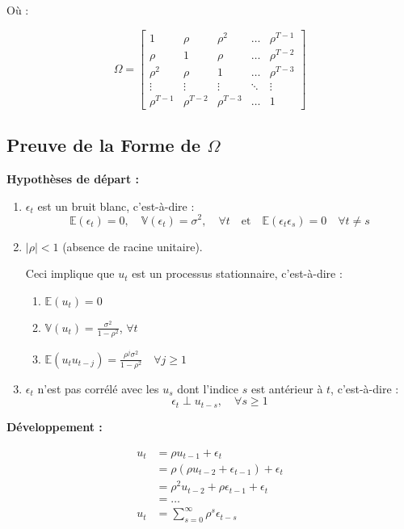 \documentclass[14pt]{extarticle} %
\theoremstyle{definition}
\theoremstyle{plain}
\begin{document}
Où :

\[
\Omega = \begin{bmatrix}
1 & \rho & \rho^2 & \dots & \rho^{T-1} \\
\rho & 1 & \rho & \dots & \rho^{T-2} \\
\rho^2 & \rho & 1 & \dots & \rho^{T-3} \\
\vdots & \vdots & \vdots & \ddots & \vdots \\
\rho^{T-1} & \rho^{T-2} & \rho^{T-3} & \dots & 1
\end{bmatrix}
\]

\subsection{Preuve de la Forme de $\Omega$}

\textbf{Hypothèses de départ :}

\begin{enumerate}
    \item $\epsilon_t$ est un bruit blanc, c'est-à-dire :
    \[
    \mathbb{E}(\epsilon_t) = 0, \quad \mathbb{V}(\epsilon_t) = \sigma^2, \quad \forall t \quad \text{et} \quad \mathbb{E}(\epsilon_t \epsilon_s) = 0 \quad \forall t \neq s
    \]
    
    \item $|\rho| < 1$ (absence de racine unitaire).
    
    Ceci implique que $u_t$ est un processus stationnaire, c'est-à-dire :
    \begin{enumerate}
        \item $\mathbb{E}(u_t) = 0$
        \item $\mathbb{V}(u_t) = \frac{\sigma^2}{1 - \rho^2}$, \quad $\forall t$
        \item $\mathbb{E}(u_t u_{t-j}) = \frac{\rho^j \sigma^2}{1 - \rho^2} \quad \forall j \geq 1$
    \end{enumerate}
    
    \item $\epsilon_t$ n’est pas corrélé avec les $u_s$ dont l’indice $s$ est antérieur à $t$, c'est-à-dire :
    \[
    \epsilon_t \perp u_{t-s}, \quad \forall s \geq 1
    \]
\end{enumerate}

\textbf{Développement :}

\begin{align}
u_t &= \rho u_{t-1} + \epsilon_t \nonumber \\
&= \rho (\rho u_{t-2} + \epsilon_{t-1}) + \epsilon_t \nonumber \\
&= \rho^2 u_{t-2} + \rho \epsilon_{t-1} + \epsilon_t \nonumber \\
&= \dots \nonumber \\
u_t &= \sum_{s=0}^{\infty} \rho^s \epsilon_{t-s} \label{eq:autoregressive}
\end{align}
\end{document}
